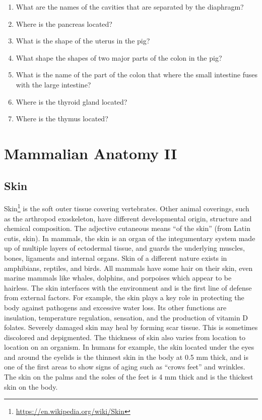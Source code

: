 \documentclass[]{book}
\providecommand{\tightlist}{%
  \setlength{\itemsep}{0pt}\setlength{\parskip}{0pt}}
\let\rmarkdownfootnote\footnote%
\def\footnote{\protect\rmarkdownfootnote}
\renewcommand{\href}[2]{#2\footnote{\url{#1}}}
\theoremstyle{definition}
\theoremstyle{definition}
\theoremstyle{definition}
\theoremstyle{remark}
\begin{document}
\begin{enumerate}
\def\labelenumi{\arabic{enumi}.}
\tightlist
\item
  What are the names of the cavities that are separated by the
  diaphragm?
\item
  Where is the pancreas located?
\item
  What is the shape of the uterus in the pig?
\item
  What shape the shapes of two major parts of the colon in the pig?
\item
  What is the name of the part of the colon that where the small
  intestine fuses with the large intestine?
\item
  Where is the thyroid gland located?
\item
  Where is the thymus located?
\end{enumerate}

\chapter{Mammalian Anatomy II}\label{mammalian-anatomy-ii}

\section{Skin}\label{skin}

\href{https://en.wikipedia.org/wiki/Skin}{Skin} is the soft outer tissue
covering vertebrates. Other animal coverings, such as the arthropod
exoskeleton, have different developmental origin, structure and chemical
composition. The adjective cutaneous means ``of the skin'' (from Latin
cutis, skin). In mammals, the skin is an organ of the integumentary
system made up of multiple layers of ectodermal tissue, and guards the
underlying muscles, bones, ligaments and internal organs. Skin of a
different nature exists in amphibians, reptiles, and birds. All mammals
have some hair on their skin, even marine mammals like whales, dolphins,
and porpoises which appear to be hairless. The skin interfaces with the
environment and is the first line of defense from external factors. For
example, the skin plays a key role in protecting the body against
pathogens and excessive water loss. Its other functions are insulation,
temperature regulation, sensation, and the production of vitamin D
folates. Severely damaged skin may heal by forming scar tissue. This is
sometimes discolored and depigmented. The thickness of skin also varies
from location to location on an organism. In humans for example, the
skin located under the eyes and around the eyelids is the thinnest skin
in the body at 0.5 mm thick, and is one of the first areas to show signs
of aging such as ``crows feet'' and wrinkles. The skin on the palms and
the soles of the feet is 4 mm thick and is the thickest skin on the
body.
\end{document}
